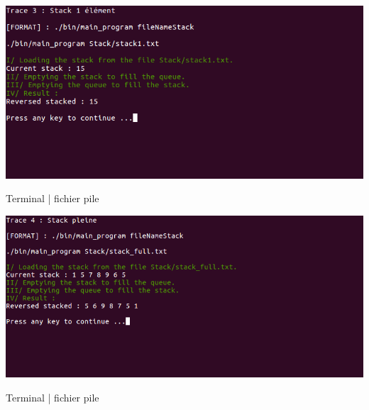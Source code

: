 \documentclass[a4paper]{article}
\begin{document}
\begin{center}
\includegraphics[scale=0.4]{trace3.png}

Terminal | fichier pile
\end{center}
\begin{center}
\includegraphics[scale=0.4]{trace4.png}

Terminal | fichier pile
\end{center}
\end{document}
